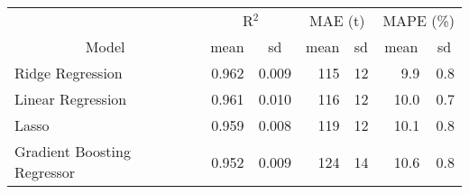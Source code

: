 
\begin{tabular}[t]{lrrrrrr}
\toprule
\multicolumn{1}{c}{ } & \multicolumn{2}{c}{R$^2$} & \multicolumn{2}{c}{MAE (t)} & \multicolumn{2}{c}{MAPE (\%)} \\
\cmidrule(l{3pt}r{3pt}){2-3} \cmidrule(l{3pt}r{3pt}){4-5} \cmidrule(l{3pt}r{3pt}){6-7}
\multicolumn{1}{c}{Model} & \multicolumn{1}{c}{mean} & \multicolumn{1}{c}{sd} & \multicolumn{1}{c}{mean} & \multicolumn{1}{c}{sd} & \multicolumn{1}{c}{mean} & \multicolumn{1}{c}{sd}\\
\midrule
Ridge Regression & 0.962 & 0.009 & 115 & 12 & 9.9 & 0.8\\
Linear Regression & 0.961 & 0.010 & 116 & 12 & 10.0 & 0.7\\
Lasso & 0.959 & 0.008 & 119 & 12 & 10.1 & 0.8\\
Gradient Boosting Regressor & 0.952 & 0.009 & 124 & 14 & 10.6 & 0.8\\
\bottomrule
\end{tabular}
